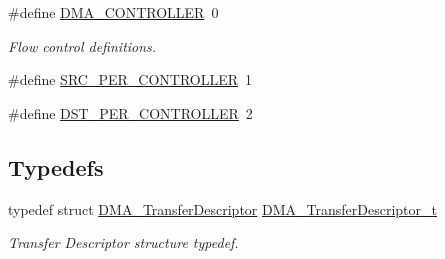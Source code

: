 \begin{DoxyCompactItemize}
\item 
\#define \hyperlink{group___g_p_d_m_a__18_x_x__43_x_x_ga42385ba8b249b55d8a140a7c35f41c35}{D\+M\+A\+\_\+\+C\+O\+N\+T\+R\+O\+L\+L\+ER}~0
\begin{DoxyCompactList}\small\item\em Flow control definitions. \end{DoxyCompactList}\item 
\#define \hyperlink{group___g_p_d_m_a__18_x_x__43_x_x_ga850a296f501c6a30228f8df251b73767}{S\+R\+C\+\_\+\+P\+E\+R\+\_\+\+C\+O\+N\+T\+R\+O\+L\+L\+ER}~1
\item 
\#define \hyperlink{group___g_p_d_m_a__18_x_x__43_x_x_ga09bdacfb969a90a403f99d379c34638c}{D\+S\+T\+\_\+\+P\+E\+R\+\_\+\+C\+O\+N\+T\+R\+O\+L\+L\+ER}~2
\end{DoxyCompactItemize}
\subsection*{Typedefs}
\begin{DoxyCompactItemize}
\item 
typedef struct \hyperlink{struct_d_m_a___transfer_descriptor}{D\+M\+A\+\_\+\+Transfer\+Descriptor} \hyperlink{group___g_p_d_m_a__18_x_x__43_x_x_ga23dbdf610f0d1f61ae30a69944bbee55}{D\+M\+A\+\_\+\+Transfer\+Descriptor\+\_\+t}
\begin{DoxyCompactList}\small\item\em Transfer Descriptor structure typedef. \end{DoxyCompactList}\end{DoxyCompactItemize}
